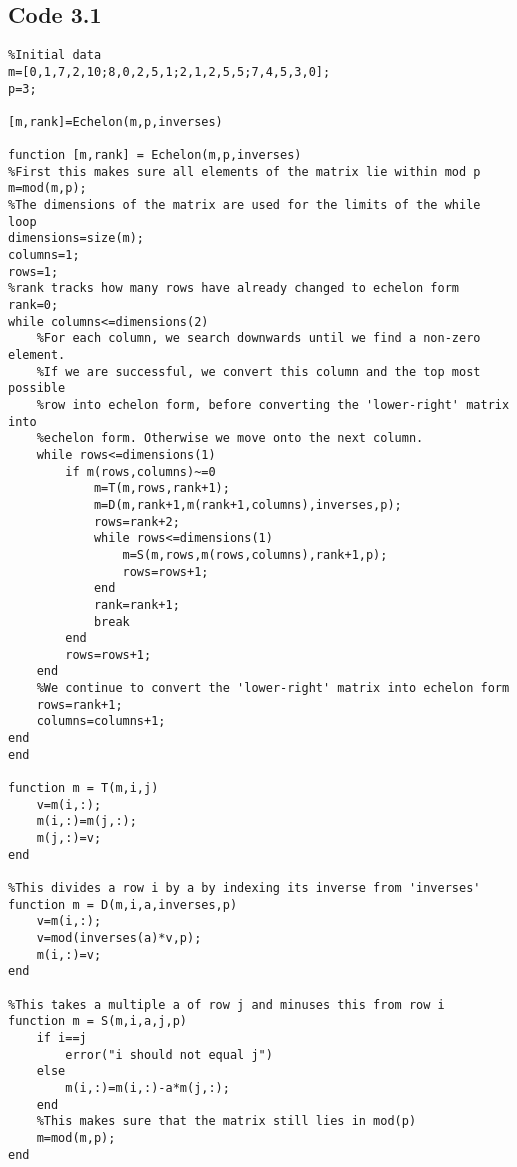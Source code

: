 \documentclass[10pt,a4paper,notitlepage]{article}
\begin{document}
\subsection*{\centering\normalsize Code 3.1} \label{subsec:Code 3.1}
\begin{verbatim}
%Initial data
m=[0,1,7,2,10;8,0,2,5,1;2,1,2,5,5;7,4,5,3,0];
p=3;

[m,rank]=Echelon(m,p,inverses)

function [m,rank] = Echelon(m,p,inverses)
%First this makes sure all elements of the matrix lie within mod p
m=mod(m,p);
%The dimensions of the matrix are used for the limits of the while loop
dimensions=size(m);
columns=1;
rows=1;
%rank tracks how many rows have already changed to echelon form
rank=0;
while columns<=dimensions(2)
    %For each column, we search downwards until we find a non-zero element.
    %If we are successful, we convert this column and the top most possible
    %row into echelon form, before converting the 'lower-right' matrix into
    %echelon form. Otherwise we move onto the next column.
    while rows<=dimensions(1)
        if m(rows,columns)~=0
            m=T(m,rows,rank+1);
            m=D(m,rank+1,m(rank+1,columns),inverses,p);
            rows=rank+2;
            while rows<=dimensions(1)
                m=S(m,rows,m(rows,columns),rank+1,p);
                rows=rows+1;
            end
            rank=rank+1;
            break
        end
        rows=rows+1;
    end
    %We continue to convert the 'lower-right' matrix into echelon form
    rows=rank+1;
    columns=columns+1;
end
end

function m = T(m,i,j)
    v=m(i,:);
    m(i,:)=m(j,:);
    m(j,:)=v;
end

%This divides a row i by a by indexing its inverse from 'inverses'
function m = D(m,i,a,inverses,p)
    v=m(i,:);
    v=mod(inverses(a)*v,p);
    m(i,:)=v;
end

%This takes a multiple a of row j and minuses this from row i
function m = S(m,i,a,j,p)
    if i==j
        error("i should not equal j")
    else
        m(i,:)=m(i,:)-a*m(j,:);
    end
    %This makes sure that the matrix still lies in mod(p)
    m=mod(m,p);
end
\end{verbatim}
\pagebreak
\end{document}
